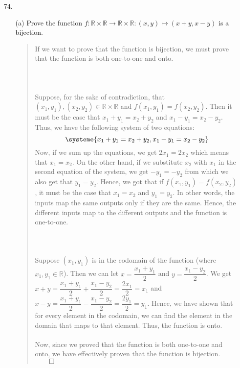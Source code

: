 \documentclass[12pt, a4paper]{article}
\newcommand{\reals}{\mathbb{R}}
\newcommand\und[1]{\underline{\smash{#1}}}
\begin{document}
\begin{itemize}
\item[74.]
\begin{itemize}
\item[(a)]
Prove the function $f : \reals \times \reals \rightarrow \reals \times \reals : (x, y) \mapsto (x + y, x - y)$
is a bijection.
\begin{quote}
If we want to prove that the function is bijection, we must prove that the function is both one-to-one and onto.
\\\\
\und{One-to-one proof}\\\\
Suppose, for the sake of contradiction, that $(x_1, y_1), (x_2, y_2) \in \reals \times \reals$
and $f(x_1, y_1) = f(x_2, y_2)$. Then it must be the case that $x_1 + y_1 = x_2 + y_2$ and $x_1 - y_1 = x_2 - y_2$.
Thus, we have the following system of two equations:\\
\begin{equation*}
    \systeme{
    x_1 + y_1 = x_2 + y_2,
    x_1 - y_1 = x_2 - y_2
    }
\end{equation*}
Now, if we sum up the equations, we get $2x_1 = 2x_2$ which means that $x_1 = x_2$. On the other hand,
if we substitute $x_2$ with $x_1$ in the second equation of the system, we get $-y_1 = -y_2$ from which
we also get that $y_1 = y_2$. Hence, we got that if $f(x_1, y_1) = f(x_2, y_2)$, it must be the case
that $x_1 = x_2$ and $y_1 = y_2$. In other words, the inputs map the same outputs only if they are the same.
Hence, the different inputs map to the different outputs and the function is one-to-one.
\\\\
\und{Onto proof}\\\\
Suppose $(x_1, y_1)$ is in the codomain of the function (where $x_1, y_1 \in \reals$). Then we can let $x = \dfrac{x_1 + y_1}{2}$
and $y = \dfrac{x_1 - y_2}{2}$. We get $x + y = \dfrac{x_1 + y_1}{2} + \dfrac{x_1 - y_2}{2} = \dfrac{2x_1}{2} = x_1$
and $x - y = \dfrac{x_1 + y_1}{2} - \dfrac{x_1 - y_2}{2} = \dfrac{2y_1}{2} = y_1$.
Hence, we have shown that for every element in the codomain, we can find the element in the domain
that maps to that element. Thus, the function is onto.
\\\\
Now, since we proved that the function is both one-to-one and onto, we have effectively proven that the function is bijection.
$\qed$
\end{quote}
\end{itemize}


\end{itemize}
\end{document}
